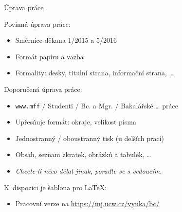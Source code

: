 \documentclass{beamer}
\begin{document}
\begin{frame}{Úprava práce}

Povinná úprava práce:

\begin{itemize}
\item Směrnice děkana 1/2015 a 5/2016
\item Formát papíru a vazba
\item Formality: desky, titulní strana, informační strana, \dots
\end{itemize}

Doporučená úprava práce:

\begin{itemize}
\item {\tt www.mff} / Studenti / Bc. a Mgr. / Bakalářské \dots{} práce
\item Upřesňuje formát: okraje, velikost písma
\item Jednostranný / oboustranný tisk (u delších prací)
\item Obsah, seznam zkratek, obrázků a tabulek, \dots
\item {\it Chcete-li něco dělat jinak, poraďte se s vedoucím.}
\end{itemize}

K~dispozici je šablona pro \LaTeX:

\begin{itemize}
\item Pracovní verze na \url{https://mj.ucw.cz/vyuka/bc/}
\end{itemize}

\end{frame}
\end{document}
